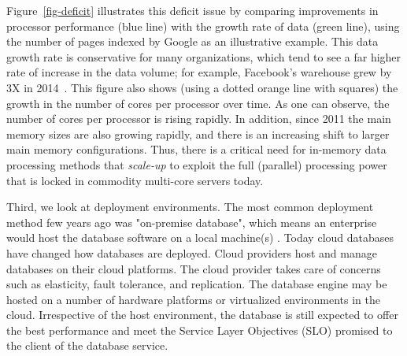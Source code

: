 Figure~\ref{fig-deficit} illustrates this deficit issue by comparing improvements in processor performance (blue line) with the growth rate of data (green line), using the number of pages indexed by Google as an illustrative example. This data growth rate is conservative for many organizations, which tend to see a far higher rate of increase in the data volume; for example, Facebook's warehouse grew by 3X in 2014~\cite{fb-growth-14}. This figure also shows (using a dotted orange line with squares) the growth in the number of cores per processor over time. As one can observe, the number of cores per processor is rising rapidly. %
In addition, %
since 2011 the main memory sizes are also growing rapidly, and there is an increasing shift to larger main memory configurations. Thus, there is a critical need for in-memory data processing methods that \textit{scale-up} to exploit the full (parallel) processing power that is locked in commodity multi-core servers today.

Third, we look at deployment environments. 
The most common deployment method few years ago was "on-premise database", which means an enterprise would host the database software on a local machine(s) . 
Today cloud databases have changed how databases are deployed.
Cloud providers host and manage databases on their cloud platforms. 
The cloud provider takes care of concerns such as elasticity, fault tolerance, and replication.
The database engine may be hosted on a number of hardware platforms or virtualized environments in the cloud.
Irrespective of the host environment, the database is still expected to offer the best performance and meet the Service Layer Objectives (SLO) promised to the client of the database service. 
